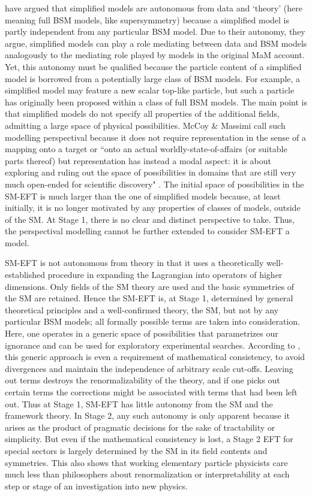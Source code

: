 \citet{mccoymassimi} have argued that simplified models are autonomous from data and `theory' (here meaning full BSM models, like supersymmetry) because a simplified model is partly independent from any particular BSM model. 
Due to their autonomy, they argue, simplified models can play a role mediating between data and BSM models analogously to the mediating role played by models in the original MaM account. 
Yet, this autonomy must be qualified because the particle content of a simplified model is borrowed from a potentially large class of BSM models. 
For example, a simplified model may feature a new scalar top-like particle, but such a particle has originally been proposed within a class of full BSM models. 
The main point is that simplified models do not specify all properties of the additional fields, admitting a large space of physical possibilities.
McCoy \& Massimi call such modelling perspectival because it does not require representation in the sense of a mapping onto a target or ``onto an actual worldly-state-of-affairs (or suitable parts thereof) but representation has instead a modal aspect: it is about exploring and ruling out the space of possibilities in domains that are still very much open-ended for scientific discovery" \citep[p.~338]{mccoymassimi}.
The initial space of possibilities in the SM-EFT is much larger than the one of simplified models because, at least initially, it is no longer motivated by any properties of classes of models, outside of the SM. 
At Stage 1, there is no clear and distinct perspective to take. 
Thus, the perspectival modelling cannot be further extended to consider SM-EFT a model.

SM-EFT is not autonomous from theory in that it uses a theoretically well-established procedure in expanding the Lagrangian into operators of higher dimensions. 
Only fields of the SM theory are used and the basic symmetries of the SM are retained. 
Hence the SM-EFT is, at Stage 1, determined by general theoretical principles and a well-confirmed theory, the SM, but not by any particular BSM models; all formally possible terms are taken into consideration.  
Here, one operates in a generic space of possibilities that parametrizes our ignorance and can be used for exploratory experimental searches. 
According to \cite{wells2012}, this generic approach is even a requirement of mathematical consistency, to avoid divergences and maintain the independence of arbitrary scale cut-offs. 
Leaving out terms destroys the renormalizability of the theory, and if one picks out certain terms the corrections might be associated with terms that had been left out. 
Thus at Stage 1, SM-EFT has little autonomy from the SM and the framework theory. 
In Stage 2, any such autonomy is only apparent because it arises as the product of pragmatic decisions for the sake of tractability or simplicity.
But even if the mathematical consistency is lost, a Stage 2 EFT for special sectors is largely determined by the SM in its field contents and symmetries. 
This also shows that working elementary particle physicists care much less than philosophers about renormalization or interpretability at each step or stage of an investigation into new physics.


